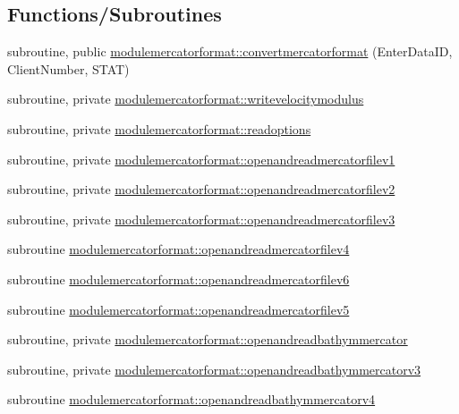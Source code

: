 \subsection*{Functions/\+Subroutines}
\begin{DoxyCompactItemize}
\item 
subroutine, public \mbox{\hyperlink{namespacemodulemercatorformat_ab5fa5a32b4c60eb82b51453effd56cbf}{modulemercatorformat\+::convertmercatorformat}} (Enter\+Data\+ID, Client\+Number, S\+T\+AT)
\item 
subroutine, private \mbox{\hyperlink{namespacemodulemercatorformat_a5f3b3ad2a9dc5c613cf6911d366fdc46}{modulemercatorformat\+::writevelocitymodulus}}
\item 
subroutine, private \mbox{\hyperlink{namespacemodulemercatorformat_a610d0a01acb7506904c2ea4c84bc688e}{modulemercatorformat\+::readoptions}}
\item 
subroutine, private \mbox{\hyperlink{namespacemodulemercatorformat_a2cf596b9eace6fa889296e8e6079f834}{modulemercatorformat\+::openandreadmercatorfilev1}}
\item 
subroutine, private \mbox{\hyperlink{namespacemodulemercatorformat_ac844e04662b11a4b75858e60dcdd690a}{modulemercatorformat\+::openandreadmercatorfilev2}}
\item 
subroutine, private \mbox{\hyperlink{namespacemodulemercatorformat_ad3d103ba2c19d6a10af53c4f7caf2a16}{modulemercatorformat\+::openandreadmercatorfilev3}}
\item 
subroutine \mbox{\hyperlink{namespacemodulemercatorformat_a784b726c2a75725a56db4e874c93724a}{modulemercatorformat\+::openandreadmercatorfilev4}}
\item 
subroutine \mbox{\hyperlink{namespacemodulemercatorformat_ab8e00c6758579bd5d8a955326cb3d6d1}{modulemercatorformat\+::openandreadmercatorfilev6}}
\item 
subroutine \mbox{\hyperlink{namespacemodulemercatorformat_a693845c08b34a8acfedbf088b2a06787}{modulemercatorformat\+::openandreadmercatorfilev5}}
\item 
subroutine, private \mbox{\hyperlink{namespacemodulemercatorformat_a35d03eb5f2e2fadb8622f62f744f0b97}{modulemercatorformat\+::openandreadbathymmercator}}
\item 
subroutine, private \mbox{\hyperlink{namespacemodulemercatorformat_a97c77676ac9667492c50594f60e6c907}{modulemercatorformat\+::openandreadbathymmercatorv3}}
\item 
subroutine \mbox{\hyperlink{namespacemodulemercatorformat_a8fac17a041e16d3f9659e7665adf2656}{modulemercatorformat\+::openandreadbathymmercatorv4}}

\end{DoxyCompactItemize}
